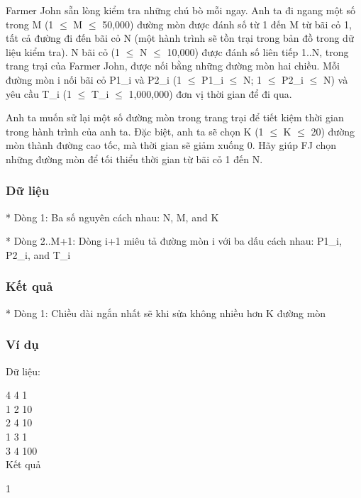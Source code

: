 



   Farmer John sẵn lòng kiểm tra những chú bò mỗi ngay. Anh ta đi ngang một số  trong M (1  $\le$  M  $\le$  50,000) đường mòn được đánh số từ 1 đến M từ bãi cỏ 1, tất  cả đường đi đến bãi cỏ N (một hành trình sẽ tồn trại trong bản đồ trong dữ  liệu kiểm tra). N bãi cỏ (1  $\le$  N  $\le$  10,000) được đánh số liên tiếp 1..N, trong  trang trại của Farmer John, được nối bằng những đường mòn hai chiều. Mỗi đường  mòn i nối bãi cỏ P1\_i và P2\_i (1  $\le$  P1\_i  $\le$  N; 1  $\le$  P2\_i  $\le$  N) và yêu cầu T\_i  (1  $\le$  T\_i  $\le$  1,000,000) đơn vị thời gian để đi qua.  

   Anh ta muốn sử lại một số đường mòn trong trang trại để tiết kiệm thời gian trong  hành trình của anh ta. Đặc biệt, anh ta sẽ chọn K (1  $\le$  K  $\le$  20) đường mòn thành  đường cao tốc, mà thời gian sẽ giảm xuống 0. Hãy giúp FJ chọn những đường mòn để  tối thiểu thời gian từ bãi cỏ 1 đến N.  

\subsubsection{   Dữ liệu  }

   * Dòng 1: Ba số nguyên cách nhau: N, M, and K  

   * Dòng 2..M+1: Dòng i+1 miêu tả đường mòn i với ba dấu cách nhau: P1\_i, P2\_i, and T\_i  

\subsubsection{   Kết quả  }

   * Dòng 1: Chiều dài ngắn nhất sẽ khi sửa không nhiều hơn K đường mòn  

\subsubsection{   Ví dụ  }

   Dữ liệu:  

   4 4 1   
\\   1 2 10   
\\   2 4 10   
\\   1 3 1   
\\   3 4 100   
\\

   Kết quả  

   1  

